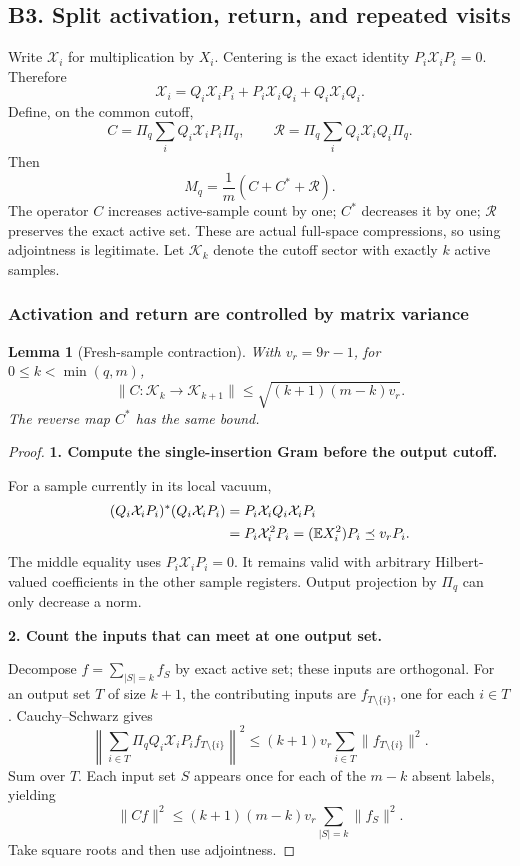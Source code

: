 \documentclass[11pt]{article}
\numberwithin{equation}{section}
\newtheorem{lemma}[theorem]{Lemma}
\theoremstyle{definition}\newtheorem{definition}[theorem]{Definition}
\theoremstyle{remark}\newtheorem{remark}[theorem]{Remark}
\newcommand{\norm}[1]{\lVert#1\rVert}\newcommand{\ip}[2]{\langle#1,#2\rangle}
\newcommand{\step}[1]{\par\addvspace{.65\baselineskip}\Needspace{4\baselineskip}\noindent\textbf{#1}\par\nobreak\smallskip}
\begin{document}
\subsection{B3. Split activation, return, and repeated visits}
Write $\mathcal X_i$ for multiplication by $X_i$. Centering is the exact identity
$P_i\mathcal X_iP_i=0$. Therefore
\[
 \mathcal X_i=Q_i\mathcal X_iP_i+P_i\mathcal X_iQ_i+Q_i\mathcal X_iQ_i.
\]
Define, on the common cutoff,
\begin{equation}\label{eq:C-R}
 C=\Pi_q\sum_iQ_i\mathcal X_iP_i\Pi_q,\qquad
 \mathcal R=\Pi_q\sum_iQ_i\mathcal X_iQ_i\Pi_q.
\end{equation}
Then
\begin{equation}\label{eq:decomposition}
 \boxed{M_q=\frac1m(C+C^*+\mathcal R).}
\end{equation}
The operator $C$ increases active-sample count by one; $C^*$ decreases it by one;
$\mathcal R$ preserves the exact active set. These are actual full-space
compressions, so using adjointness is legitimate.
Let $\mathcal K_k$ denote the cutoff sector with exactly $k$ active samples.

\subsubsection{Activation and return are controlled by matrix variance}
\begin{lemma}[Fresh-sample contraction]\label{lem:fresh}
With $v_r=9r-1$, for $0\le k<\min(q,m)$,
\begin{equation}\label{eq:fresh}
 \norm{C:\mathcal K_k\to\mathcal K_{k+1}}
 \le\sqrt{(k+1)(m-k)v_r}.
\end{equation}
The reverse map $C^*$ has the same bound.
\end{lemma}
\begin{proof}
\step{1. Compute the single-insertion Gram before the output cutoff.}
For a sample currently in its local vacuum,
\begin{align*}
 (Q_i\mathcal X_iP_i)^*(Q_i\mathcal X_iP_i)
 &=P_i\mathcal X_iQ_i\mathcal X_iP_i\\
 &=P_i\mathcal X_i^2P_i
 = (\mathbb E X_i^2)P_i\preceq v_rP_i.
\end{align*}
The middle equality uses $P_i\mathcal X_iP_i=0$.
It remains valid with arbitrary Hilbert-valued coefficients in the other sample
registers. Output projection by $\Pi_q$ can only decrease a norm.

\step{2. Count the inputs that can meet at one output set.}
Decompose $f=\sum_{|S|=k}f_S$ by exact active set; these inputs are orthogonal.
For an output set $T$ of size $k+1$, the contributing inputs are
$f_{T\setminus\{i\}}$, one for each $i\in T$. Cauchy--Schwarz gives
\[
 \left\|\sum_{i\in T}\Pi_q Q_i\mathcal X_iP_i f_{T\setminus\{i\}}\right\|^2
 \le(k+1)v_r\sum_{i\in T}\norm{f_{T\setminus\{i\}}}^2.
\]
Sum over $T$. Each input set $S$ appears once for each of the $m-k$ absent
labels, yielding
\[
 \norm{Cf}^2\le(k+1)(m-k)v_r\sum_{|S|=k}\norm{f_S}^2.
\]
Take square roots and then use adjointness.
\end{proof}
\end{document}
